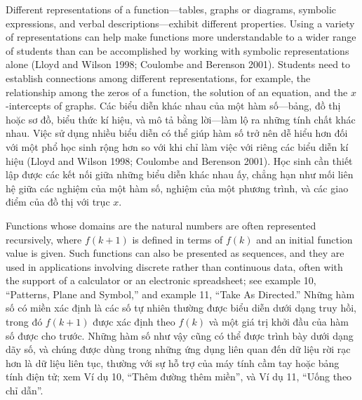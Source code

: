 \documentclass[
  10pt,
  a4paper,
  landscape,
  twoside,
  openany
]{scrbook}
\newcommand{\EN}[1]{#1}
\newcommand{\VI}[1]{#1}
\newcommand{\NOTE}[1]{#1}
\newcounter{example}
\begin{document}
\TriPara
{
\EN{Different representations of a function---tables, graphs or diagrams, symbolic expressions, and verbal descriptions---exhibit different properties. Using a variety of representations can help make functions more understandable to a wider range of students than can be accomplished by working with symbolic representations alone (Lloyd and Wilson 1998; Coulombe and Berenson 2001). Students need to establish connections among different representations, for example, the relationship among the zeros of a function, the solution of an equation, and the $x$-intercepts of graphs.}
}
{
\VI{Các biểu diễn khác nhau của một hàm số---bảng, đồ thị hoặc sơ đồ, biểu thức kí hiệu, và mô tả bằng lời---làm lộ ra những tính chất khác nhau. Việc sử dụng nhiều biểu diễn có thể giúp hàm số trở nên dễ hiểu hơn đối với một phổ học sinh rộng hơn so với khi chỉ làm việc với riêng các biểu diễn kí hiệu (Lloyd and Wilson 1998; Coulombe and Berenson 2001). Học sinh cần thiết lập được các kết nối giữa những biểu diễn khác nhau ấy, chẳng hạn như mối liên hệ giữa các nghiệm của một hàm số, nghiệm của một phương trình, và các giao điểm của đồ thị với trục $x$.}
}
{
\NOTE{}
}

\TriPara
{
\EN{Functions whose domains are the natural numbers are often represented recursively, where $f(k + 1)$ is defined in terms of $f(k)$ and an initial function value is given. Such functions can also be presented as sequences, and they are used in applications involving discrete rather than continuous data, often with the support of a calculator or an electronic spreadsheet; see example 10, ``Patterns, Plane and Symbol,'' and example 11, ``Take As Directed.''}
}
{
\VI{Những hàm số có miền xác định là các số tự nhiên thường được biểu diễn dưới dạng truy hồi, trong đó $f(k+1)$ được xác định theo $f(k)$ và một giá trị khởi đầu của hàm số được cho trước. Những hàm số như vậy cũng có thể được trình bày dưới dạng dãy số, và chúng được dùng trong những ứng dụng liên quan đến dữ liệu rời rạc hơn là dữ liệu liên tục, thường với sự hỗ trợ của máy tính cầm tay hoặc bảng tính điện tử; xem Ví dụ 10, ``Thêm đường thêm miền'', và Ví dụ 11, ``Uống theo chỉ dẫn''.}
}
{
\NOTE{}
}
\end{document}

